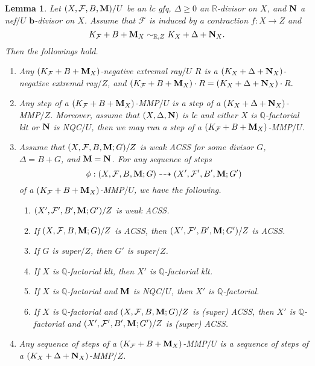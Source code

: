 \documentclass[11pt]{amsart}
\numberwithin{equation}{section}
\newcommand{\bb}{\bm{b}}
\newcommand{\Mm}{{\bf{M}}}
\newcommand{\Nn}{{\bf{N}}}
\newcommand{\Qq}{\mathbb{Q}}
\newcommand{\Rr}{\mathbb{R}}
\newcommand{\Ff}{\mathcal{F}}
\newtheorem{lem}[thm]{Lemma}
\theoremstyle{definition}
\theoremstyle{definition}
\theoremstyle{definition}
\begin{document}
\begin{lem}\label{lem: ACSS mmp can run}
Let $(X,\Ff,B,\Mm)/U$ be an lc gfq, $\Delta\geq 0$ an $\Rr$-divisor on $X$, and $\Nn$ a nef$/U$ $\bb$-divisor on $X$. Assume that $\Ff$ is induced by a contraction $f: X\rightarrow Z$ and 
$$K_{\Ff}+B+\Mm_X\sim_{\mathbb R,Z}K_X+\Delta+\Nn_X.$$
 Then the followings hold.
\begin{enumerate}
    \item Any $(K_{\Ff}+B+\Mm_X)$-negative extremal ray$/U$ $R$ is a $(K_X+\Delta+\Nn_X)$-negative extremal ray$/Z$, and $(K_{\Ff}+B+\Mm_X)\cdot R=(K_X+\Delta+\Nn_X)\cdot R.$
    \item Any step of a $(K_{\Ff}+B+\Mm_X)$-MMP$/U$ is a step of a $(K_X+\Delta+\Nn_X)$-MMP$/Z$. Moreover, assume that $(X,\Delta,\Nn)$ is lc and either $X$ is $\Qq$-factorial klt or $\Nn$ is NQC$/U$, then we may run a step of a $(K_{\Ff}+B+\Mm_X)$-MMP$/U$.
    \item Assume that $(X,\Ff,B,\Mm;G)/Z$ is weak ACSS for some divisor $G$, $\Delta=B+G$, and $\Mm=\Nn$. For any sequence of steps $$\phi: (X,\Ff,B,\Mm;G)\dashrightarrow (X',\Ff',B',\Mm;G')$$ 
    of a $(K_{\Ff}+B+\Mm_X)$-MMP$/U$, we have the following.
    \begin{enumerate}
    \item $(X',\Ff',B',\Mm;G')/Z$ is weak ACSS.
        \item If $(X,\Ff,B,\Mm;G)/Z$ is ACSS, then $(X',\Ff',B',\Mm;G')/Z$ is ACSS. 
        \item If $G$ is super$/Z$, then $G'$ is super$/Z$.
        \item If $X$ is $\Qq$-factorial klt, then $X'$ is $\Qq$-factorial klt. 
        \item If $X$ is $\Qq$-factorial and $\Mm$ is NQC$/U$, then $X'$ is $\Qq$-factorial.
        \item If $X$ is $\Qq$-factorial and $(X,\Ff,B,\Mm;G)/Z$ is (super) ACSS, then $X'$ is $\Qq$-factorial and $(X',\Ff',B',\Mm;G')/Z$ is (super) ACSS.
    \end{enumerate}
    \item Any sequence of steps of a $(K_{\Ff}+B+\Mm_X)$-MMP$/U$ is a sequence of steps of a $(K_X+\Delta+\Nn_X)$-MMP$/Z$.
\end{enumerate}
\end{lem}
\end{document}
